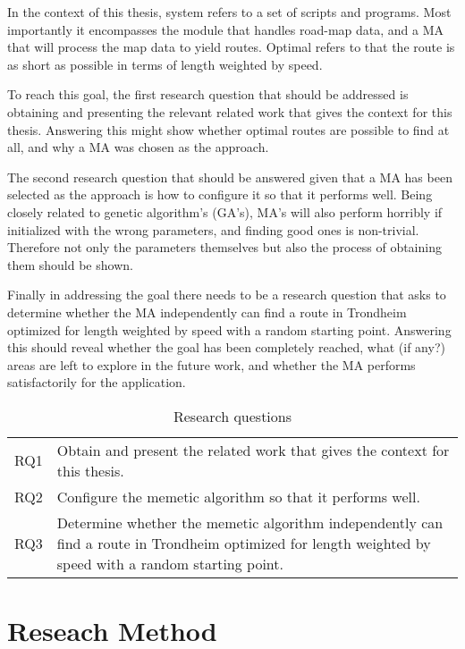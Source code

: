 In the context of this thesis, system refers to a set of scripts and programs. Most importantly it encompasses the module that handles road-map data, and a MA that will process the map data to yield routes. Optimal refers to that the route is as short as possible in terms of length weighted by speed.

To reach this goal, the first research question that should be addressed is obtaining and presenting the relevant related work that gives the context for this thesis. Answering this might show whether optimal routes are possible to find at all, and why a MA was chosen as the approach.

The second research question that should be answered given that a MA has been selected as the approach is how to configure it so that it performs well. Being closely related to genetic algorithm's (GA's), MA's will also perform horribly if initialized with the wrong parameters, and finding good ones is non-trivial. Therefore not only the parameters themselves but also the process of obtaining them should be shown.

Finally in addressing the goal there needs to be a research question that asks to determine whether the MA independently can find a route in Trondheim optimized for length weighted by speed with a random starting point. Answering this should reveal whether the goal has been completely reached, what (if any?) areas are left to explore in the future work, and whether the MA performs satisfactorily for the application.

\begin{table}[H]
\centering
\begin{tabular}{cp{}}
RQ1  &  Obtain and present the related work that gives the context for this thesis. \\
RQ2  &  Configure the memetic algorithm so that it performs well.\\
RQ3  &  Determine whether the memetic algorithm independently can find a route in Trondheim optimized for length weighted by speed with a random starting point. \\
\end{tabular}
\caption{Research questions}
\label{tab:research_questions}
\end{table}

\section{Reseach Method}

